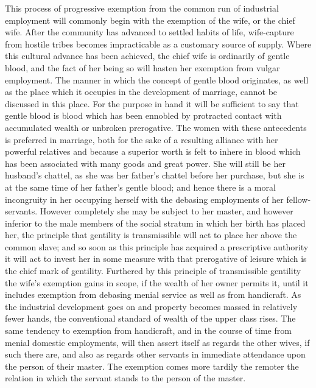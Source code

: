 \documentclass[12pt]{report}
\begin{document}
This process of progressive exemption from the common run of industrial
employment will commonly begin with the exemption of the wife, or the
chief wife. After the community has advanced to settled habits of life,
wife-capture from hostile tribes becomes impracticable as a customary
source of supply. Where this cultural advance has been achieved, the
chief wife is ordinarily of gentle blood, and the fact of her being so
will hasten her exemption from vulgar employment. The manner in which
the concept of gentle blood originates, as well as the place which it
occupies in the development of marriage, cannot be discussed in this
place. For the purpose in hand it will be sufficient to say that gentle
blood is blood which has been ennobled by protracted contact with
accumulated wealth or unbroken prerogative. The women with these
antecedents is preferred in marriage, both for the sake of a resulting
alliance with her powerful relatives and because a superior worth is
felt to inhere in blood which has been associated with many goods and
great power. She will still be her husband's chattel, as she was her
father's chattel before her purchase, but she is at the same time of
her father's gentle blood; and hence there is a moral incongruity in her
occupying herself with the debasing employments of her fellow-servants.
However completely she may be subject to her master, and however
inferior to the male members of the social stratum in which her birth
has placed her, the principle that gentility is transmissible will act
to place her above the common slave; and so soon as this principle has
acquired a prescriptive authority it will act to invest her in some
measure with that prerogative of leisure which is the chief mark of
gentility. Furthered by this principle of transmissible gentility the
wife's exemption gains in scope, if the wealth of her owner permits it,
until it includes exemption from debasing menial service as well as from
handicraft. As the industrial development goes on and property becomes
massed in relatively fewer hands, the conventional standard of wealth of
the upper class rises. The same tendency to exemption from handicraft,
and in the course of time from menial domestic employments, will then
assert itself as regards the other wives, if such there are, and also as
regards other servants in immediate attendance upon the person of their
master. The exemption comes more tardily the remoter the relation in
which the servant stands to the person of the master.
\end{document}
